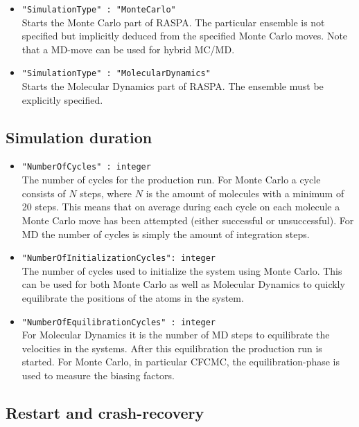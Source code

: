 \begin{itemize}
\item{\verb+"SimulationType" : "MonteCarlo"+}\\
Starts the Monte Carlo part of RASPA. The particular ensemble is not specified but implicitly deduced from
the specified Monte Carlo moves. Note that a MD-move can be used for hybrid MC/MD.
\item{\verb+"SimulationType" : "MolecularDynamics"+}\\
Starts the Molecular Dynamics part of RASPA. The ensemble must be explicitly specified.
\end{itemize}

\subsection{Simulation duration}

\begin{itemize}
\item{\verb+"NumberOfCycles" : integer+}\\
The number of cycles for the production run.
For Monte Carlo a cycle consists of $N$ steps, where $N$ is the amount of
molecules with a minimum of 20 steps. This means that on average during each cycle on each molecule a
Monte Carlo move has been attempted (either successful or unsuccessful). For MD the number of cycles
is simply the amount of integration steps.
\item{\verb+"NumberOfInitializationCycles": integer+}\\
The number of cycles used to initialize the system using Monte Carlo. This can be used for both Monte Carlo
as well as Molecular Dynamics to quickly equilibrate the positions of the atoms in the system.
\item{\verb+"NumberOfEquilibrationCycles" : integer+}\\
For Molecular Dynamics  it is the number of MD steps to equilibrate the velocities in the systems. After this
equilibration the production run is started. For Monte Carlo, in particular CFCMC, the equilibration-phase is used
to measure the biasing factors.
\end{itemize}

\subsection{Restart and crash-recovery}

